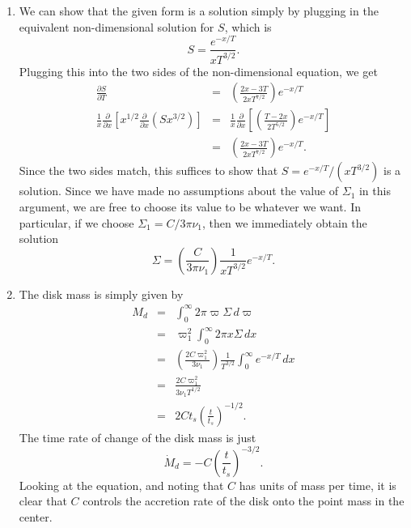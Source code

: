 \begin{enumerate}
\begin{enumerate}
\item We can show that the given form is a solution simply by plugging in the equivalent non-dimensional solution for $S$, which is
\begin{displaymath}
S = \frac{e^{-x/T}}{x T^{3/2}}.
\end{displaymath}
Plugging this into the two sides of the non-dimensional equation, we get
\begin{eqnarray*}
\frac{\partial S}{\partial T} & = & \left(\frac{2x - 3 T}{2 x T^{7/2}}\right) e^{-x/T} \\
\frac{1}{x} \frac{\partial}{\partial x} \left[x^{1/2} \frac{\partial}{\partial x} \left(S x^{3/2}\right)\right]
& = & 
\frac{1}{x} \frac{\partial}{\partial x} \left[\left(\frac{T-2x}{2 T^{5/2}}\right) e^{-x/T}\right] \\
& = & \left(\frac{2x - 3 T}{2 x T^{7/2}}\right) e^{-x/T}.
\end{eqnarray*}
Since the two sides match, this suffices to show that $S=e^{-x/T}/(x T^{3/2})$ is a solution. Since we have made no assumptions about the value of $\Sigma_1$ in this argument, we are free to choose its value to be whatever we want. In particular, if we choose $\Sigma_1 = C/3\pi \nu_1$, then we immediately obtain the solution
\begin{displaymath}
\Sigma = \left(\frac{C}{3\pi \nu_1}\right)\frac{1}{x T^{3/2}} e^{-x/T}.
\end{displaymath}

\item The disk mass is simply given by
\begin{eqnarray*}
M_d & = & \int_0^\infty 2\pi \varpi \Sigma \, d\varpi \\
& = & \varpi_1^2 \int_0^\infty 2\pi x \Sigma \, dx \\
& = & \left(\frac{2 C \varpi_1^2}{3 \nu_1}\right) \frac{1}{T^{3/2}} \int_0^\infty e^{-x/T} \, dx \\
& = & \frac{2 C \varpi_1^2}{3 \nu_1 T^{1/2}} \\
& = & 2 C t_s \left(\frac{t}{t_s}\right)^{-1/2}.
\end{eqnarray*}
The time rate of change of the disk mass is just
\begin{displaymath}
\dot{M}_d = -C \left(\frac{t}{t_s}\right)^{-3/2}.
\end{displaymath}
Looking at the equation, and noting that $C$ has units of mass per time, it is clear that $C$ controls the accretion rate of the disk onto the point mass in the center.


\end{enumerate}
\end{enumerate}
